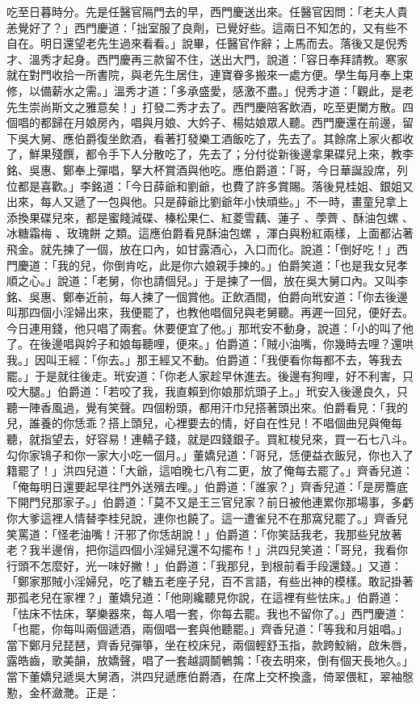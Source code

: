 \begin{showcontents}{}
吃至日暮時分。先是任醫官隔門去的早，西門慶送出來。任醫官因問：「老夫人貴恙覺好了？」西門慶道：「拙室服了良劑，已覺好些。這兩日不知怎的，又有些不自在。明日還望老先生過來看看。」說畢，任醫官作辭；上馬而去。落後又是倪秀才、溫秀才起身。西門慶再三款留不住，送出大門，說道：「容日奉拜請教。寒家就在對門收拾一所書院，與老先生居住，連寶眷多搬來一處方便。學生每月奉上束修，以備薪水之需。」溫秀才道：「多承盛愛，感激不盡。」倪秀才道：「觀此，是老先生崇尚斯文之雅意矣！」打發二秀才去了。西門慶陪客飲酒，吃至更闌方散。四個唱的都歸在月娘房內，唱與月娘、大妗子、楊姑娘眾人聽。西門慶還在前邊，留下吳大舅、應伯爵復坐飲酒，看著打發樂工酒飯吃了，先去了。其餘席上家火都收了，鮮果殘饌，都令手下人分散吃了，先去了；分付從新後邊拿果碟兒上來，教李銘、吳惠、鄭奉上彈唱，拏大杯賞酒與他吃。應伯爵道：「哥，今日華誕設席，列位都是喜歡。」李銘道：「今日薛爺和劉爺，也費了許多賞賜。落後見桂姐、銀姐又出來，每人又遞了一包與他。只是薛爺比劉爺年小快頑些。」不一時，畫童兒拿上添換果碟兒來，都是蜜餞減碟、榛松果仁、紅菱雪藕、蓮子 、荸薺 、酥油包螺 、冰糖霜梅 、玫瑰餅 之類。這應伯爵看見酥油包螺 ，渾白與粉紅兩樣，上面都沾著飛金。就先揀了一個，放在口內，如甘露酒心，入口而化。說道：「倒好吃！」西門慶道：「我的兒，你倒肯吃，此是你六娘親手揀的。」伯爵笑道：「也是我女兒孝順之心。」說道：「老舅，你也請個兒。」于是揀了一個，放在吳大舅口內。又叫李銘、吳惠、鄭奉近前，每人揀了一個賞他。正飲酒間，伯爵向玳安道：「你去後邊叫那四個小淫婦出來，我便罷了，也教他唱個兒與老舅聽。再遲一回兒，便好去。今日連用錢，他只唱了兩套。休要便宜了他。」那玳安不動身，說道：「小的叫了他了。在後邊唱與妗子和娘每聽哩，便來。」伯爵道：「賊小油嘴，你幾時去哩？還哄我。」因叫王經：「你去。」那王經又不動。伯爵道：「我便看你每都不去，等我去罷。」于是就往後走。玳安道：「你老人家趁早休進去。後邊有狗哩，好不利害，只咬大腿。」伯爵道：「若咬了我，我直賴到你娘那炕頭子上。」玳安入後邊良久，只聽一陣香風過，覺有笑聲。四個粉頭，都用汗巾兒搭著頭出來。伯爵看見：「我的兒，誰養的你恁乖？搭上頭兒，心裡要去的情，好自在性兒！不唱個曲兒與俺每聽，就指望去，好容易！連轎子錢，就是四錢銀子。買紅梭兒來，買一石七八斗。勾你家鴇子和你一家大小吃一個月。」董嬌兒道：「哥兒，恁便益衣飯兒，你也入了籍罷了！」洪四兒道：「大爺，這咱晚七八有二更，放了俺每去罷了。」齊香兒道：「俺每明日還要起早往門外送殯去哩。」伯爵道：「誰家？」齊香兒道：「是房簷底下開門兒那家子。」伯爵道：「莫不又是王三官兒家？前日被他連累你那場事，多虧你大爹這裡人情替李桂兒說，連你也饒了。這一遭雀兒不在那窩兒罷了。」齊香兒笑罵道：「怪老油嘴！汗邪了你恁胡說！」伯爵道：「你笑話我老，我那些兒放著老？我半邊俏，把你這四個小淫婦兒還不勾擺布！」洪四兒笑道：「哥兒，我看你行頭不怎麼好，光一味好撇！」伯爵道：「我那兒，到根前看手段還錢。」又道：「鄭家那賊小淫婦兒，吃了糖五老座子兒，百不言語，有些出神的模樣。敢記掛著那孤老兒在家裡？」董嬌兒道：「他剛纔聽見你說，在這裡有些怯床。」伯爵道：「怯床不怯床，拏樂器來，每人唱一套，你每去罷。我也不留你了。」西門慶道：「也罷，你每叫兩個遞酒，兩個唱一套與他聽罷。」齊香兒道：「等我和月姐唱。」當下鄭月兒琵琶，齊香兒彈箏，坐在校床兒，兩個輕舒玉指，款跨鮫綃，啟朱唇，露皓齒，歌美韻，放嬌聲，唱了一套越調鬬鵪鶉：「夜去明來，倒有個天長地久。」當下董嬌兒遞吳大舅酒，洪四兒遞應伯爵酒，在席上交杯換盞，倚翠偎紅，翠袖慇懃，金杯瀲灧。正是：


\end{showcontents}
